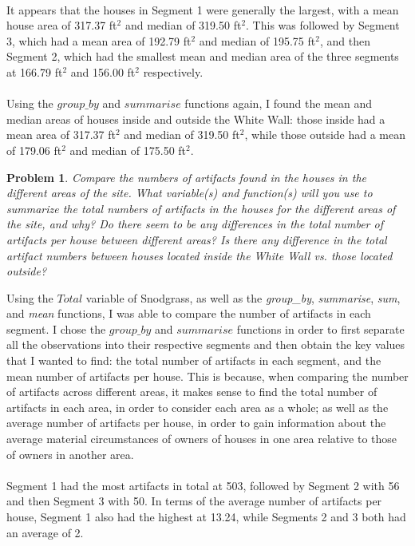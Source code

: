 \documentclass[12pt]{article}
\newtheorem{problem}{Problem}
\begin{document}
     \\
     It appears that the houses in Segment 1 were generally the largest, with a mean house area of 317.37 ft$^2$ and median of 319.50 ft$^2$. This was followed by Segment 3, which had a mean area of 192.79 ft$^2$ and median of 195.75 ft$^2$, and then Segment 2, which had the smallest mean and median area of the three segments at 166.79 ft$^2$ and 156.00 ft$^2$ respectively.\\
     \\
     Using the $group\_by$ and $summarise$ functions again, I found the mean and median areas of houses inside and outside the White Wall: those inside had a mean area of 317.37 ft$^2$ and median of 319.50 ft$^2$, while those outside had a mean of 179.06 ft$^2$ and median of 175.50 ft$^2$.\color{black}

 \begin{problem}
     Compare the numbers of artifacts found in the houses in the different areas of the site. What
variable(s) and function(s) will you use to summarize the total numbers of artifacts in the houses
for the different areas of the site, and why? Do there seem to be any differences in the total
number of artifacts per house between different areas? Is there any difference in the total
artifact numbers between houses located inside the White Wall vs. those located outside?
 \end{problem}
 \color{nr}
     Using the $Total$ variable of Snodgrass, as well as the \textit{group\_by}, \textit{summarise}, \textit{sum}, and \textit{mean} functions, I was able to compare the number of artifacts in each segment. I chose the $group\_by$ and $summarise$ functions in order to first separate all the observations into their respective segments and then obtain the key values that I wanted to find: the total number of artifacts in each segment, and the mean number of artifacts per house. This is because, when comparing the number of artifacts across different areas, it makes sense to find the total number of artifacts in each area, in order to consider each area as a whole; as well as the average number of artifacts per house, in order to gain information about the average material circumstances of owners of houses in one area relative to those of owners in another area. \\
     \\
     Segment 1 had the most artifacts in total at 503, followed by Segment 2 with 56 and then Segment 3 with 50. In terms of the average number of artifacts per house, Segment 1 also had the highest at 13.24, while Segments 2 and 3 both had an average of 2.\\
\end{document}
